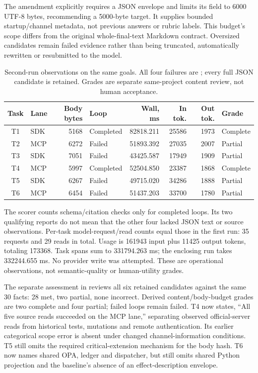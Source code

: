 \documentclass[11pt,letterpaper]{article}
\newcommand{\code}[1]{\texttt{\detokenize{#1}}}
\begin{document}
The amendment explicitly requires a JSON envelope and limits its
\code{report_markdown} field to 6000 UTF-8 bytes, recommending a 5000-byte target.
It supplies bounded startup/channel metadata, not previous answers or rubric
labels. This budget's scope differs from the original whole-final-text Markdown
contract. Oversized candidates remain failed evidence rather than being
truncated, automatically rewritten or resubmitted to the model.

\begin{table}[tbp]
\centering\small
\begin{tabular}{@{}clrlrrrl@{}}
\toprule Task & Lane & Body bytes & Loop & Wall, ms & In tok. & Out tok. & Grade \\
\midrule
T1 & SDK & 5168 & Completed & 82818.211 & 25586 & 1973 & Complete \\
T2 & MCP & 6272 & Failed & 51893.392 & 27035 & 2007 & Partial \\
T3 & SDK & 7051 & Failed & 43425.587 & 17949 & 1909 & Partial \\
T4 & MCP & 5997 & Completed & 52504.850 & 23387 & 1868 & Complete \\
T5 & SDK & 6267 & Failed & 49715.020 & 34286 & 1888 & Partial \\
T6 & MCP & 6454 & Failed & 51437.203 & 33700 & 1780 & Partial \\
\bottomrule
\end{tabular}
\caption{Second-run observations on the same goals. All four failures are
\code{report_bytes_exceeded}; every full JSON candidate is retained. Grades
are separate same-project content review, not human acceptance.}
\label{tab:field-repeat}
\end{table}

The scorer counts schema/citation checks only for completed loops. Its two
qualifying reports do not mean that the other four lacked JSON text or source
observations. Per-task model-request/read counts equal those in the first run:
35 requests and 29 reads in total. Usage is 161943 input plus 11425 output tokens,
totaling 173368. Task spans sum to 331794.263 ms; the enclosing run takes
332244.655 ms. No provider write was attempted. These are operational
observations, not semantic-quality or human-utility grades.

The separate assessment in 
reviews all six retained candidates against the same 30 facts: 28 met, two
partial, none incorrect. Derived content/body-budget grades are two complete
and four partial; failed loops remain failed. T4 now states, ``All five source
reads succeeded on the MCP lane,'' separating observed official-server reads
from historical tests, mutations and remote authentication. Its earlier
categorical scope error is absent under changed channel-information conditions.
T5 still omits the required critical-extension mechanism for the body hash.
T6 now names shared OPA, ledger and dispatcher, but still omits shared Python
projection and the baseline's absence of an effect-description envelope.
\end{document}
